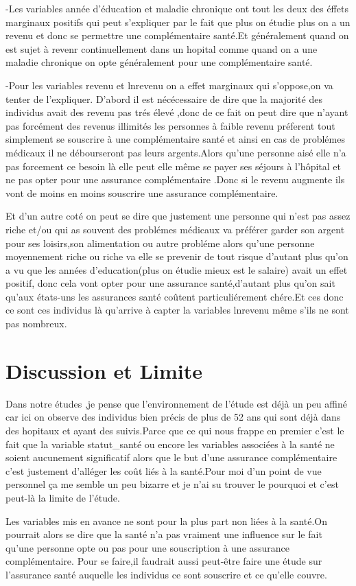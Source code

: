 \documentclass[
  14pt,
  french,
]{article}
\begin{document}
-Les variables année d'éducation et maladie chronique ont tout les deux
des éffets marginaux positifs qui peut s'expliquer par le fait que plus
on étudie plus on a un revenu et donc se permettre une complémentaire
santé.Et généralement quand on est sujet à revenr continuellement dans
un hopital comme quand on a une maladie chronique on opte généralement
pour une complémentaire santé.

-Pour les variables revenu et lnrevenu on a effet marginaux qui
s'oppose,on va tenter de l'expliquer. D'abord il est nécécessaire de
dire que la majorité des individus avait des revenu pas trés élevé ,donc
de ce fait on peut dire que n'ayant pas forcément des revenus illimités
les personnes à faible revenu préferent tout simplement se souscrire à
une complémentaire santé et ainsi en cas de problémes médicaux il ne
débourseront pas leurs argents.Alors qu'une personne aisé elle n'a pas
forcement ce besoin là elle peut elle même se payer ses séjours à
l'hôpital et ne pas opter pour une assurance complémentaire .Donc si le
revenu augmente ils vont de moins en moins souscrire une assurance
complémentaire.

\linebreak

Et d'un autre coté on peut se dire que justement une personne qui n'est
pas assez riche et/ou qui as souvent des problémes médicaux va préférer
garder son argent pour ses loisirs,son alimentation ou autre probléme
alors qu'une personne moyennement riche ou riche va elle se prevenir de
tout risque d'autant plus qu'on a vu que les années d'education(plus on
étudie mieux est le salaire) avait un effet positif, donc cela vont
opter pour une assurance santé,d'autant plus qu'on sait qu'aux états-uns
les assurances santé coûtent particuliérement chére.Et ces donc ce sont
ces individus là qu'arrive à capter la variables lnrevenu même s'ils ne
sont pas nombreux.

\hypertarget{discussion-et-limite}{%
\section{Discussion et Limite}\label{discussion-et-limite}}

Dans notre études ,je pense que l'environnement de l'étude est déjà un
peu affiné car ici on observe des individus bien précis de plus de 52
ans qui sont déjà dans des hopitaux et ayant des suivis.Parce que ce qui
nous frappe en premier c'est le fait que la variable statut\_santé ou
encore les variables associées à la santé ne soient aucunement
significatif alors que le but d'une assurance complémentaire c'est
justement d'alléger les coût liés à la santé.Pour moi d'un point de vue
personnel ça me semble un peu bizarre et je n'ai su trouver le pourquoi
et c'est peut-là la limite de l'étude.

\linebreak

Les variables mis en avance ne sont pour la plus part non liées à la
santé.On pourrait alors se dire que la santé n'a pas vraiment une
influence sur le fait qu'une personne opte ou pas pour une souscription
à une assurance complémentaire. Pour se faire,il faudrait aussi
peut-être faire une étude sur l'assurance santé auquelle les individus
ce sont souscrire et ce qu'elle couvre.
\end{document}
